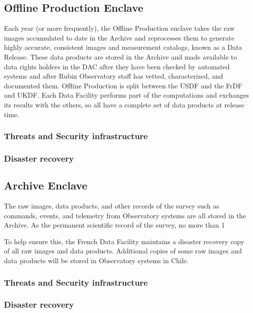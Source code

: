 \subsection{ Offline Production  Enclave}
Each year (or more frequently), the Offline Production enclave takes the raw images accumulated to date in the Archive and reprocesses them to generate highly accurate, consistent images and measurement catalogs, known as a Data Release. These data products are stored in the Archive and made available to data rights holders in the DAC after they have been checked by automated systems and after Rubin Observatory staff has vetted, characterized, and documented them. Offline Production is split between the USDF and the FrDF and UKDF. Each Data Facility performs part of the computations and exchanges its results with the others, so all have a complete set of data products at release time.


\subsubsection{ Threats and Security infrastructure}
\subsubsection{Disaster recovery}


\subsection{ Archive  Enclave}
The raw images, data products, and other records of the survey such as commands, events, and telemetry from Observatory systems are all stored in the Archive. As the permanent scientific record of the survey, no more than 1%

To help ensure this, the French Data Facility maintains a disaster recovery copy of all raw images and data products. Additional copies of some raw images and data products will be stored in Observatory systems in Chile.

\subsubsection{ Threats and Security infrastructure}
\subsubsection{Disaster recovery}



